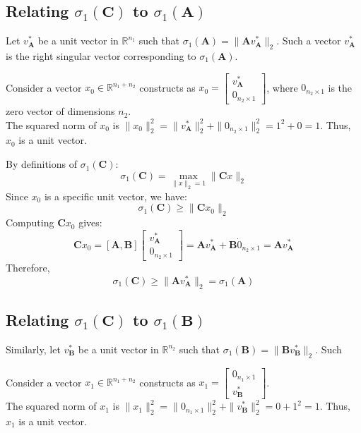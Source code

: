 \subsection{Relating $\sigma_1(\mathbf{C})$ to $\sigma_1(\mathbf{A})$}
\label{sec:bigger-than-A}
Let $v_{\mathbf{A}}^*$ be a unit vector in $\mathbb{R}^{n_1}$ such that
$\sigma_1(\mathbf{A}) = \parallel \mathbf{A}v_{\mathbf{A}}^* \parallel_2$. Such
a vector $v_{\mathbf{A}}^*$ is the right singular vector corresponding to
$\sigma_1(\mathbf{A})$.

Consider a vector $x_0 \in \mathbb{R}^{n_1 + n_2}$ constructs as $x_0 =
\begin{bmatrix} v_{\mathbf{A}}^* \\ 0_{n_2 \times 1} \end{bmatrix}$, where
$0_{n_2 \times 1}$ is the zero vector of dimensions $n_2$.\\
The squared norm of $x_0$ is $\parallel x_0 \parallel_2^2 = \parallel
v_{\mathbf{A}}^* \parallel_2^2 + \parallel 0_{n_2 \times 1} \parallel_2^2 = 1^2
+ 0  = 1$. Thus, $x_0$ is a unit vector.

By definitions of $\sigma_1(\mathbf{C})$:
\[ \sigma_1(\mathbf{C}) = \max_{\parallel x \parallel_2 = 1} \parallel
\mathbf{C}x \parallel_2 \]
Since $x_0$ is a specific unit vector, we have:
\[ \sigma_1(\mathbf{C}) \geq \parallel \mathbf{C}x_0 \parallel_2 \]
Computing $\mathbf{C}x_0$ gives:
\[ \mathbf{C}x_0 = [\mathbf{A}, \mathbf{B}] \begin{bmatrix} v_{\mathbf{A}}^* \\
0_{n_2 \times 1} \end{bmatrix} = \mathbf{A}v_{\mathbf{A}}^* + \mathbf{B} \dot
0_{n_2 \times 1} = \mathbf{A}v_{\mathbf{A}}^* \]
Therefore,
\[ \sigma_1(\mathbf{C}) \geq \parallel \mathbf{A}v_{\mathbf{A}}^* \parallel_2 =
\sigma_1(\mathbf{A})\]

\subsection{Relating $\sigma_1(\mathbf{C})$ to $\sigma_1(\mathbf{B})$}
\label{sec:bigger-than-B}
Similarly, let $v_{\mathbf{B}}^*$ be a unit vector in $\mathbb{R}^{n_2}$ such that
$\sigma_1(\mathbf{B}) = \parallel \mathbf{B}v_{\mathbf{B}}^* \parallel_2$. Such

Consider a vector $x_1 \in \mathbb{R}^{n_1 + n_2}$ constructs as $x_1 =
\begin{bmatrix} 0_{n_1 \times 1} \\ v_{\mathbf{B}}^* \end{bmatrix}$.\\
The squared norm of $x_1$ is $\parallel x_1 \parallel_2^2 = \parallel 0_{n_1
\times 1} \parallel_2^2 + \parallel v_{\mathbf{B}}^* \parallel_2^2 = 0 + 1^2 =
1$. Thus, $x_1$ is a unit vector.


